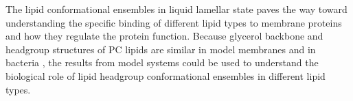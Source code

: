 \documentclass[aps,prl,superscriptaddress,twocolumn]{revtex4}
\begin{document}
The lipid conformational ensembles in liquid lamellar state paves the way toward understanding the
specific binding of different lipid types to membrane proteins and how they regulate the protein function.
Because glycerol backbone and headgroup structures of PC lipids are similar in model membranes and in bacteria \cite{gally81,scherer87,seelig90},
the results from model systems could be used to understand the biological role of lipid headgroup conformational ensembles in different lipid types.


\end{document}
